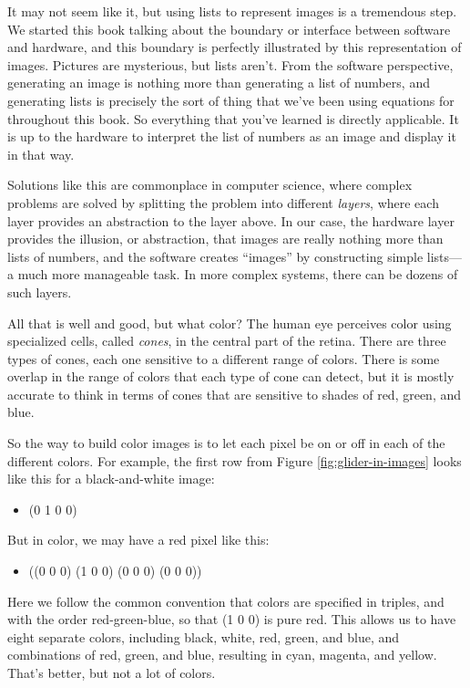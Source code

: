 It may not seem like it, but using lists to represent images is
a tremendous step. We started this book talking about the boundary
or interface between software and hardware, and this boundary is
perfectly illustrated by this representation of images. Pictures
are mysterious, but lists aren't. From the software perspective,
generating an image is nothing more than generating a list of
numbers, and generating lists is precisely the sort of thing that
we've been using equations for throughout this book. So everything
that you've learned is directly applicable. It is up to the hardware 
to interpret the list of numbers as an image and display it in
that way. 

Solutions like this are commonplace in computer science,
where complex problems are solved by splitting the problem into 
different \emph{layers}, where each layer provides an abstraction 
to the layer above. In our case, the hardware layer provides the
illusion, or abstraction, that images are really nothing more than
lists of numbers, and the software creates ``images'' by constructing
simple lists---a much more manageable task. In more complex systems,
there can be dozens of such layers.

All that is well and good, but what color? The human eye perceives
color using specialized cells, called \emph{cones}, in the central
part of the retina. There are three types of cones, each one sensitive
to a different range of colors. There is some overlap in the range
of colors that each type of cone can detect, but it is mostly accurate
to think in terms of cones that are sensitive to shades of red, green, 
and blue. 

So the way to build color images is to let each pixel be on or off in
each of the different colors. For example, the first row from 
Figure \ref{fig:glider-in-images} looks like this for a black-and-white
image:
\begin{itemize}
    \item \textsf{(0 1 0 0)}
\end{itemize}
But in color, we may have a red pixel like this:
\begin{itemize}
    \item \textsf{((0 0 0) (1 0 0) (0 0 0) (0 0 0))}
\end{itemize}
Here we follow the common convention that colors are specified in triples, 
and with the order red-green-blue, so that \textsf{(1 0 0)} is pure red.
This allows us to have eight separate colors, including black, white, red,
green, and blue, and combinations of red, green, and blue, resulting
in cyan, magenta, and yellow. That's better, but not a lot of colors.

